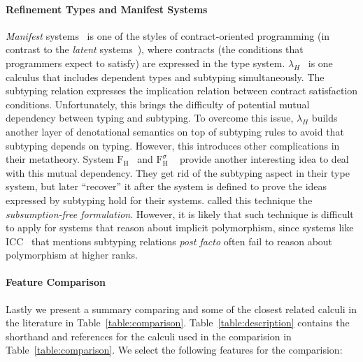 \paragraph{Refinement Types and Manifest Systems}

\emph{Manifest} systems~\citep{manifestcontracts} is one of the styles of
contract-oriented programming (in contrast to the \emph{latent} systems~\citep{latentcontracts}),
where contracts (the conditions that programmers expect to satisfy) are expressed
in the type system. $\lambda_H$~\citep{hybridtypes,manifestcontracts} is one calculus that
includes dependent types and subtyping simultaneously. The subtyping relation
expresses the implication relation between contract satisfaction conditions. Unfortunately,
this brings the difficulty of potential mutual dependency between typing and subtyping.
To overcome this issue, $\lambda_H$ builds another layer of denotational semantics on top of
subtyping rules to avoid that subtyping depends on typing. However, this introduces
other complications in their metatheory.
System $\mathrm{F}_\mathrm{H}$~\citep{fh} and $\mathrm{F}_\mathrm{H}^\sigma$
~\citep{fhsigma} provide another
interesting idea to deal with this mutual dependency. They get rid of the
subtyping aspect in their type system, but later ``recover'' it after
the system is defined to prove the ideas expressed by subtyping hold for their systems.
\citet{fhsigma} called this technique the \emph{subsumption-free formulation}.
However, it is likely that such technique is difficult to apply for systems that
reason about implicit polymorphism, since
systems like ICC~\citep{miquel2001implicit} that mentions subtyping relations
\emph{post facto} often fail to reason about polymorphism at higher ranks.

\paragraph{Feature Comparison}
Lastly we present a summary comparing \name and some of the closest related calculi
in the literature in Table~\ref{table:comparison}. Table~\ref{table:description} contains the
shorthand and references for the calculi used in the comparision in Table~\ref{table:comparison}.
We select the following features for the comparision:


